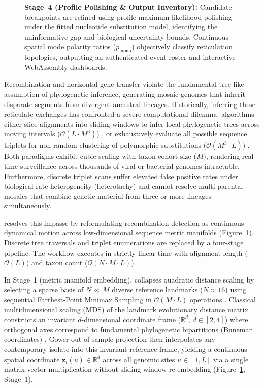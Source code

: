 \begin{figure}[!t]
{\textbf{Stage~4 (Profile Polishing \& Output Inventory):} Candidate breakpoints are refined using profile maximum likelihood polishing under the fitted nucleotide substitution model, identifying the uninformative gap and biological uncertainty bounds. Continuous spatial mode polarity ratios ($p_{\text{mono}}$) objectively classify reticulation topologies, outputting an authenticated event roster and interactive WebAssembly dashboards.}
\label{fig:method_overview}
\end{figure}

Recombination and horizontal gene transfer violate the fundamental tree-like assumption of phylogenetic inference, generating mosaic genomes that inherit disparate segments from divergent ancestral lineages.
Historically, inferring these reticulate exchanges has confronted a severe computational dilemma: algorithms either slice alignments into sliding windows to infer local phylogenetic trees across moving intervals ($\mathcal{O}(L \cdot M^3)$) \citep{martin2015rdp4,kosakovsky2006gard}, or exhaustively evaluate all possible sequence triplets for non-random clustering of polymorphic substitutions ($\mathcal{O}(M^3 \cdot L)$) \citep{boni2007exact,lam20183seq}.
Both paradigms exhibit cubic scaling with taxon cohort size ($M$), rendering real-time surveillance across thousands of viral or bacterial genomes intractable.
Furthermore, discrete triplet scans suffer elevated false positive rates under biological rate heterogeneity (heterotachy) and cannot resolve multi-parental mosaics that combine genetic material from three or more lineages simultaneously.

\RhizAeon resolves this impasse by reformulating recombination detection as continuous dynamical motion across low-dimensional sequence metric manifolds (Figure~\ref{fig:method_overview}).
Discrete tree traversals and triplet enumerations are replaced by a four-stage pipeline.
The workflow executes in strictly linear time with alignment length ($\mathcal{O}(L)$) and taxon count ($\mathcal{O}(N \cdot M \cdot L)$).

In Stage~1 (metric manifold embedding), \RhizAeon collapses quadratic distance scaling by selecting a sparse basis of $N \ll M$ diverse reference landmarks ($N \approx 16$) using sequential Farthest-Point Minimax Sampling in $\mathcal{O}(M \cdot L)$ operations \citep{gonzalez1985clustering}.
Classical multidimensional scaling (MDS) of the landmark evolutionary distance matrix constructs an invariant $d$-dimensional coordinate frame ($\mathbb{R}^d$, $d \in [2, 4]$) where orthogonal axes correspond to fundamental phylogenetic bipartitions (Buneman coordinates) \citep{buneman1974note}.
Gower out-of-sample projection then interpolates any contemporary isolate into this invariant reference frame, yielding a continuous spatial coordinate $\mathbf{z}_i(u) \in \mathbb{R}^d$ across all genomic sites $u \in [1, L]$ via a single matrix-vector multiplication without sliding window re-embedding (Figure~\ref{fig:method_overview}, Stage~1).

